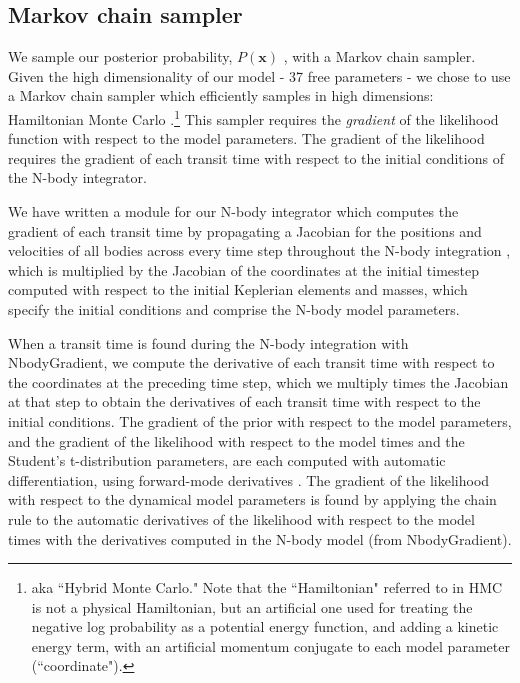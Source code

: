 \documentclass[twocolumn]{aastex63}
\begin{document}
\subsection{Markov chain sampler}

We sample our posterior probability, $P(\mathbf{x})$ ,
with a Markov chain sampler.
Given the high dimensionality of our model - 37 free parameters - we chose to use
a Markov chain sampler which efficiently samples in high dimensions:  Hamiltonian
Monte Carlo \citep[HMC; ][]{Duane1987,Neal2011,Betancourt2017,Monnahan2016}.\footnote{aka ``Hybrid Monte Carlo." Note
    that the ``Hamiltonian" referred to in HMC is not a physical Hamiltonian, but an
    artificial one used for treating the negative log probability as a potential
    energy function, and adding a kinetic energy term, with an artificial momentum conjugate
    to each model parameter (``coordinate").}  This
sampler requires the {\it gradient} of the likelihood function with respect to
the model parameters.  The gradient of the likelihood requires the gradient
of each transit time with respect to the initial conditions of the N-body
integrator.

We have written a module for our N-body integrator which computes the
gradient of each transit time by propagating a Jacobian for the positions
and velocities of all bodies across every time step throughout the N-body
integration \citep{Agol2020}, which is multiplied by the Jacobian of the coordinates at the initial timestep computed with respect to the initial Keplerian elements and masses, which specify the initial conditions and comprise the N-body model parameters.

When a transit time is found during the N-body integration with \textsf{NbodyGradient}, we compute the derivative of each transit time with respect to
the coordinates at the preceding time step, which we multiply times the Jacobian
at that step to obtain the derivatives of each transit time with respect to the
initial conditions.
The gradient of the prior with respect to the model parameters, and the gradient of the likelihood with respect to the model times and the Student's t-distribution parameters, are each computed with automatic
differentiation, using forward-mode derivatives  \citep{Revels2016}.  The gradient of the likelihood with
respect to the dynamical model parameters is found by applying the chain rule to the automatic derivatives of the likelihood with respect to the model times with the derivatives computed in the N-body model (from \textsf{NbodyGradient}).
\end{document}
